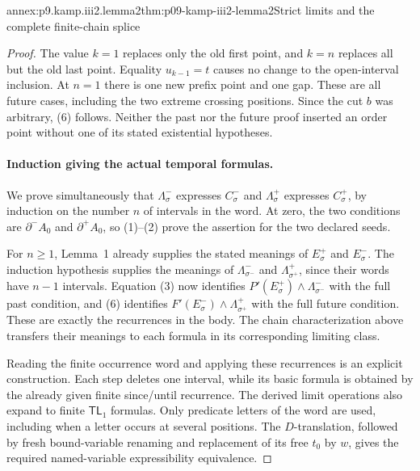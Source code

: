 \begin{annexitem}{annex:p9.kamp.iii2.lemma2}{thm:p09-kamp-iii2-lemma2}{Strict limits and the complete finite-chain splice}
\begin{proof}
The value \(k=1\) replaces only the old first point, and \(k=n\)
replaces all but the old last point.  Equality \(u_{k-1}=t\) causes no
change to the open-interval inclusion.  At \(n=1\) there is one new
prefix point and one gap.  These are all future cases, including the two
extreme crossing positions.  Since the cut \(b\) was arbitrary, (6)
follows.  Neither the past nor the future proof inserted an order point
without one of its stated existential hypotheses.

\paragraph{Induction giving the actual temporal formulas.}
We prove simultaneously that \(\Lambda^-_\sigma\) expresses
\(C^-_\sigma\) and \(\Lambda^+_\sigma\) expresses \(C^+_\sigma\),
by induction on the number \(n\) of intervals in the word.  At zero,
the two conditions are \(\partial^-A_0\) and \(\partial^+A_0\),
so (1)--(2) prove the assertion for the two declared seeds.

For \(n\geq1\), Lemma~1 already supplies the stated meanings of
\(E^+_\sigma\) and \(E^-_\sigma\).  The induction hypothesis supplies
the meanings of \(\Lambda^-_{\sigma^-}\) and
\(\Lambda^+_{\sigma^+}\), since their words have \(n-1\) intervals.
Equation (3) now identifies
\(P'(E^+_\sigma)\land\Lambda^-_{\sigma^-}\) with the full past
condition, and (6) identifies
\(F'(E^-_\sigma)\land\Lambda^+_{\sigma^+}\) with the full future
condition.  These are exactly the recurrences in the body.  The chain
characterization above transfers their meanings to each formula in its
corresponding limiting class.

Reading the finite occurrence word and applying these recurrences is an
explicit construction.  Each step deletes one interval, while its basic
formula is obtained by the already given finite since/until recurrence.
The derived limit operations also expand to finite \(\mathsf{TL}_1\)
formulas.  Only predicate letters of the word are used, including when a
letter occurs at several positions.  The \(D\)-translation, followed by
fresh bound-variable renaming and replacement of its free \(t_0\) by
\(w\), gives the required named-variable expressibility equivalence.


\end{proof}
\end{annexitem}
